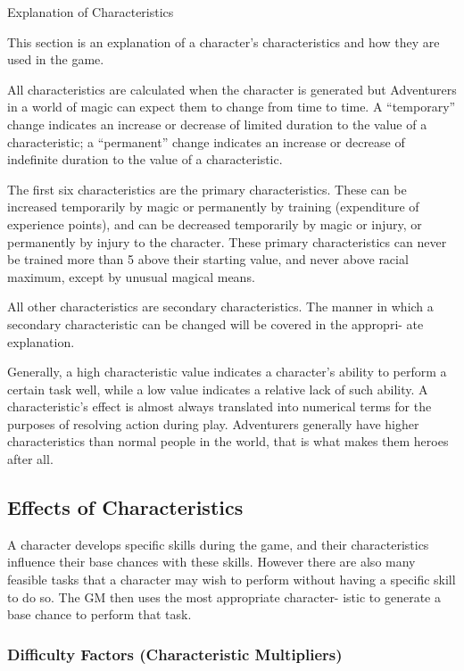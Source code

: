 \begin{Chapter}{Explanation of Characteristics}

This section is an explanation of a character’s characteristics and
how they are used in the game.

All characteristics are calculated when the character is generated but
Adventurers in a world of magic can expect them to change from time to
time.  A “temporary” change indicates an increase or decrease of
limited duration to the value of a characteristic; a “permanent”
change indicates an increase or decrease of indefinite duration to the
value of a characteristic.

The first six characteristics are the primary characteristics.  These
can be increased temporarily by magic or permanently by training
(expenditure of experience points), and can be decreased temporarily
by magic or injury, or permanently by injury to the character.  These
primary characteristics can never be trained more than 5 above their
starting value, and never above racial maximum, except by unusual
magical means.

All other characteristics are secondary characteristics.  The manner
in which a secondary characteristic can be changed will be covered in
the appropri- ate explanation.

Generally, a high characteristic value indicates a character’s ability
to perform a certain task well, while a low value indicates a relative
lack of such ability.  A characteristic’s effect is almost always
translated into numerical terms for the purposes of resolving action
during play. Adventurers generally have higher characteristics than
normal people in the world, that is what makes them heroes after all.

\subsection{Effects of Characteristics}

A character develops specific skills during the game, and their
characteristics influence their base chances with these skills.
However there are also many feasible tasks that a character may wish
to perform without having a specific skill to do so.  The GM then uses
the most appropriate character- istic to generate a base chance to
perform that task.

\subsubsection{Difficulty Factors (Characteristic Multipliers)}


\end{Chapter}
